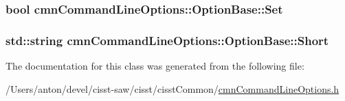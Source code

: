 \subsubsection[{Set}]{\setlength{\rightskip}{0pt plus 5cm}bool cmn\+Command\+Line\+Options\+::\+Option\+Base\+::\+Set}\label{classcmn_command_line_options_1_1_option_base_a1bab794e3d379aabf0daf3edaf4abd54}
\hypertarget{classcmn_command_line_options_1_1_option_base_aa7799a5119c4018ddb5e10eebbde2d16}{}
\subsubsection[{Short}]{\setlength{\rightskip}{0pt plus 5cm}std\+::string cmn\+Command\+Line\+Options\+::\+Option\+Base\+::\+Short}\label{classcmn_command_line_options_1_1_option_base_aa7799a5119c4018ddb5e10eebbde2d16}


The documentation for this class was generated from the following file\+:\begin{DoxyCompactItemize}
\item 
/\+Users/anton/devel/cisst-\/saw/cisst/cisst\+Common/\hyperlink{cmn_command_line_options_8h}{cmn\+Command\+Line\+Options.\+h}\end{DoxyCompactItemize}
